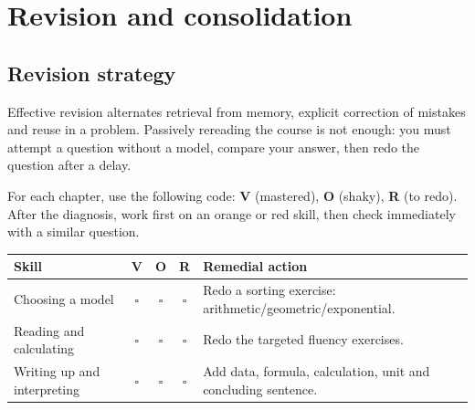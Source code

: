 
\chapter{Revision and consolidation}
\section{Revision strategy}
\begin{retenir}
Effective revision alternates retrieval from memory, explicit correction of mistakes and reuse in a problem. Passively rereading the course is not enough: you must attempt a question without a model, compare your answer, then redo the question after a delay.
\end{retenir}

For each chapter, use the following code: \textbf{V} (mastered), \textbf{O} (shaky), \textbf{R} (to redo). After the diagnosis, work first on an orange or red skill, then check immediately with a similar question.

\begin{center}
\begin{tabularx}{.9\textwidth}{lcccX}
\toprule
Skill & V & O & R & Remedial action \\
\midrule
Choosing a model & $\square$ & $\square$ & $\square$ & Redo a sorting exercise: arithmetic/geometric/exponential.\\
Reading and calculating & $\square$ & $\square$ & $\square$ & Redo the targeted fluency exercises.\\
Writing up and interpreting & $\square$ & $\square$ & $\square$ & Add data, formula, calculation, unit and concluding sentence.\\
\bottomrule
\end{tabularx}
\end{center}

